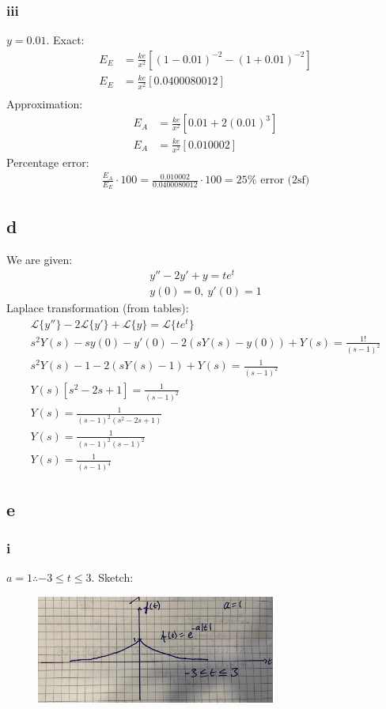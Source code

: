 \documentclass[11pt]{article}
\numberwithin{equation}{section}
\begin{document}
\subsubsection*{iii}
$y = 0.01$. Exact:
\begin{align}
	E_E &= \frac{ke}{x^2} \left[\left(1-0.01\right)^{-2}-\left(1+0.01\right)^{-2}\right]\\
	E_E &= \frac{ke}{x^2} \left[0.0400080012\right]\\
\end{align}
Approximation:
\begin{align}
	E_A &= \frac{ke}{x^2} \left[0.01 + 2\left(0.01\right)^3\right]\\
	E_A &= \frac{ke}{x^2} \left[0.010002\right]
\end{align}
Percentage error:
\begin{align}
	\frac{E_A}{E_E} \cdot 100 = \frac{0.010002}{0.0400080012} \cdot 100 = 25\% \textrm{ error (2sf)}
\end{align}
\subsection*{d}
We are given:
\begin{align}
	y'' - 2y' + y = te^t\\
	y(0) = 0, \ y'(0)=1
\end{align}
Laplace transformation (from tables):
\begin{gather}
	\mathcal{L} \{ y''\} - 2\mathcal{L} \{ y'\} + \mathcal{L} \{ y\} = \mathcal{L} \{te^t \}\\
	s^2 Y(s) - sy(0) - y'(0) - 2\left(sY(s) - y(0)\right) + Y(s) = \frac{1!}{\left(s-1\right)^2}\\
	s^2 Y(s) -1 -2(sY(s) - 1) + Y(s) = \frac{1}{\left(s-1\right)^2}\\
	Y(s)\left[s^2-2s+1\right] = \frac{1}{\left(s-1\right)^2}\\
	Y(s) = \frac{1}{\left(s-1\right)^2\left(s^2-2s+1\right)}\\
	Y(s) = \frac{1}{\left(s-1\right)^2\left(s-1\right)^2}\\
	Y(s) = \frac{1}{\left(s-1\right)^4} 
\end{gather}
\subsection*{e}
\subsubsection*{i}
$a =1 \therefore -3 \leq t \leq 3$. Sketch:
\begin{figure}[H]
	\centering
	\includegraphics[width = 0.7\textwidth]{./img/q1ei.JPG}
	\caption{}
\end{figure}
\end{document}
